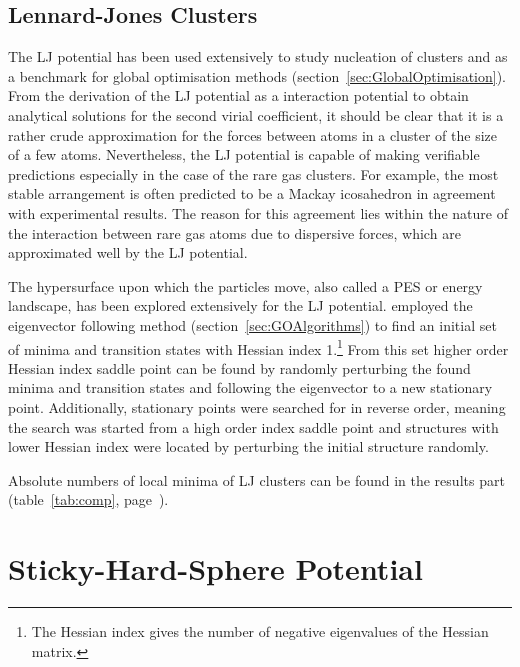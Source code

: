 \subsection{Lennard-Jones Clusters}
\label{sec:LJClusters}

The \ac{LJ} potential has been used extensively to study nucleation of clusters
and as a benchmark for global optimisation methods
(section~\ref{sec:GlobalOptimisation}). From the derivation of the \ac{LJ}
potential as a interaction potential to obtain analytical solutions for the second
virial coefficient, it should be clear that it is a rather crude approximation
for the forces between atoms in a cluster of the size of a few atoms.
Nevertheless, the \ac{LJ} potential is capable of making verifiable predictions
especially in the case of the rare gas
clusters.\autocite{Wales_Energylandscapes_2003} For example, the most stable
arrangement is often predicted to be a Mackay icosahedron in agreement with
experimental results.\autocite{Kakar_SizedependentKedgeEXAFS_1997} The reason
for this agreement lies within the nature of the interaction between rare gas
atoms due to dispersive forces, which are approximated well by the \ac{LJ}
potential.

The hypersurface upon which the particles move, also called a \ac{PES} or energy
landscape, has been explored extensively for the \ac{LJ} potential.
\autocite{Tsai_Useeigenmodemethod_1993,Ball_Dynamicsstatisticalsamples_1999,Doye_Saddlepointsdynamics_2002} \citeauthor{Doye_Saddlepointsdynamics_2002}\autocite{Doye_Saddlepointsdynamics_2002}
employed the eigenvector following method (section~\ref{sec:GOAlgorithms}) to
find an initial set of minima and transition states with Hessian index
1.\footnote{The Hessian index gives the number of negative eigenvalues of the
Hessian matrix.} From this set higher order Hessian index saddle point can be
found by randomly perturbing the found minima and transition states and
following the eigenvector to a new stationary point. Additionally, stationary
points were searched for in reverse order, meaning the search was started from a
high order index saddle point and structures with lower Hessian index were
located by perturbing the initial structure randomly.

Absolute numbers of local minima of \ac{LJ} clusters can be found in the results
part (table~\ref{tab:comp}, page~\pageref{tab:comp}).

\section{Sticky-Hard-Sphere Potential}
\label{sec:SHS}

